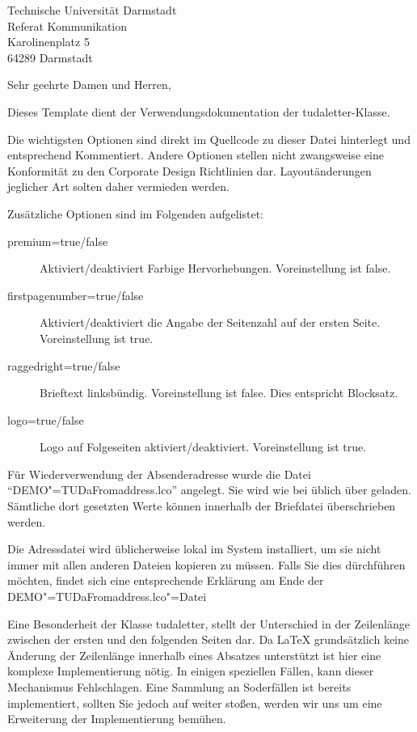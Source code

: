 \documentclass[
	ngerman,
	accentcolor=9c,%
	premium=true,%
]{tudaletter}
\begin{document}
	
\begin{letter}{%
    Technische Universität Darmstadt\\%
    Referat Kommunikation\\%
    Karolinenplatz 5\\%
    64289 Darmstadt}


\opening{Sehr geehrte Damen und Herren,}
Dieses Template dient der Verwendungsdokumentation der tudaletter-Klasse.

Die wichtigsten Optionen sind direkt im Quellcode zu dieser Datei hinterlegt und entsprechend Kommentiert. Andere Optionen stellen nicht zwangsweise eine Konformität zu den Corporate Design Richtlinien dar. Layoutänderungen jeglicher Art solten daher vermieden werden.

Zusätzliche Optionen sind im Folgenden aufgelistet:\\
\parbox{\linewidth}{
\begin{description}
	\item[premium=true/false] Aktiviert/deaktiviert Farbige Hervorhebungen. Voreinstellung ist false.
	\item[firstpagenumber=true/false] Aktiviert/deaktiviert die Angabe der Seitenzahl auf der ersten Seite. Voreinstellung ist true.
	\item[raggedright=true/false] Brieftext linksbündig. Voreinstellung ist false. Dies entspricht Blocksatz.
	\item[logo=true/false] Logo auf Folgeseiten aktiviert/deaktiviert. Voreinstellung ist true.
\end{description}
}

Für Wiederverwendung der Absenderadresse wurde die Datei \enquote{DEMO"=TUDaFromaddress.lco} angelegt. Sie wird wie bei \KOMAScript{} üblich über
geladen. Sämtliche dort gesetzten Werte können innerhalb der Briefdatei überschrieben werden.

Die Adressdatei wird üblicherweise lokal im System installiert, um sie nicht immer mit allen anderen Dateien kopieren zu müssen. Falls Sie dies dürchführen möchten, findet sich eine entsprechende Erklärung am Ende der DEMO"=TUDaFromaddress.lco"=Datei

Eine Besonderheit der Klasse tudaletter, stellt der Unterschied in der Zeilenlänge zwischen der ersten und den folgenden Seiten dar. Da \LaTeX{} grundsätzlich keine Änderung der Zeilenlänge innerhalb eines Absatzes unterstützt ist hier eine komplexe Implementierung nötig. In einigen speziellen Fällen, kann dieser Mechanismus Fehlschlagen. Eine Sammlung an Soderfällen ist bereits implementiert, sollten Sie jedoch auf weiter stoßen, werden wir uns um eine Erweiterung der Implementierung bemühen.


\end{letter}
\end{document}
